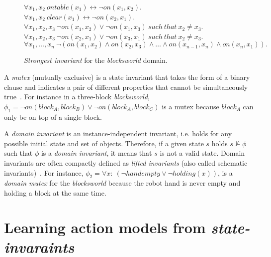 \documentclass{article}
\begin{document}
\begin{figure}[hbt!]
  \begin{footnotesize}
$\forall x_1,x_2\ ontable(x_1)\leftrightarrow\neg on(x_1,x_2)$.\\
$\forall x_1,x_2\ clear(x_1)\leftrightarrow\neg on(x_2,x_1)$.\\
$\forall x_1,x_2,x_3\ \neg on(x_1,x_2)\vee\neg on(x_1,x_3)\ such\ that\ x_2\neq x_3$.\\
$\forall x_1,x_2,x_3\ \neg on(x_2,x_1)\vee\neg on(x_3,x_1)\ such\ that\ x_2\neq x_3$.\\
$\forall x_1,\ldots,x_n\ \neg(on(x_1,x_2)\wedge on(x_2,x_3)\wedge\ldots\wedge on(x_{n-1},x_n)\wedge on(x_n,x_1)).$
\end{footnotesize}
 \caption{\small {\em Strongest invariant} for the {\em blocksworld} domain.}
\label{fig:strongest-invariant}
\end{figure}


A {\em mutex} (mutually exclusive) is a state invariant that takes the form of a binary clause and indicates a pair of different properties that cannot be simultaneously true~\cite{kautz:mutex:IJCAI1999}. For instance in a three-block {\em blocksworld}, $\phi_1=\neg on(block_A,block_B)\vee \neg on(block_A,block_C)$ is a mutex because $block_A$ can only be on top of a single block.

A {\em domain invariant} is an instance-independent invariant, i.e. holds for any possible initial state and set of objects. Therefore, if a given state $s$ holds $s\nvDash \phi$ such that $\phi$ is a {\em domain invariant}, it means that $s$ is not a valid state. Domain invariants are often compactly defined as {\em lifted invariants} (also called schematic invariants)~\cite{rintanen:schematicInvariants:AAAI2017}. For instance, $\phi_2=\forall x:\ (\neg handempty\vee \neg holding(x))$, is a {\em domain mutex} for the {\em blocksworld} because the robot hand is never empty and holding a block at the same time.



\section{Learning action models from {\em state-invaraints}}
\label{sec:evaluation}
\end{document}
